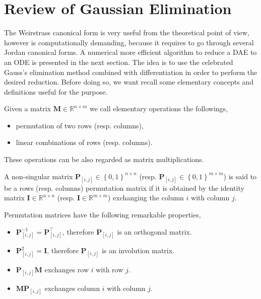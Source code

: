 	\section{Review of Gaussian Elimination}
		The Weirstrass canonical form is very useful from the theoretical point of view,
		however is computationally demanding, because it requires to go through several
		Jordan canonical forms. A numerical more efficient algorithm to reduce a DAE to
		an ODE is presented in the next section. The idea is to use the celebrated
		Gauss's elimination method combined with differentiation in order to perform
		the desired reduction. Before doing so, we want recall some elementary concepts
		and definitions useful for the purpose.
		\begin{definition}
			Given a matrix $\bm{M}\in\mathbb{R}^{n\times m}$ we call elementary operations the followings,
			\begin{itemize}
				\item permutation of two rows (resp. columns),
				\item linear combinations of rows (resp. columns). 
			\end{itemize} 
		\end{definition}
		These operations can be also regarded as matrix multiplications.
		\begin{definition}
			A non-singular matrix $\bm{P}_{[i,j]}\in\left\lbrace0,1\right\rbrace^{n\times n}$ 
			(resp. $\bm{P}_{[i,j]}\in\left\lbrace0,1\right\rbrace^{m\times m}$) is said to be a
			rows (resp. columns) permutation matrix if it is obtained by the identity matrix
			$\bm{I}\in\mathbb{R}^{n\times n}$ (resp. $\bm{I}\in\mathbb{R}^{m\times m}$)
			exchanging the column $i$ with column $j$.
		\end{definition}
		Permutation matrices have the following remarkable properties,
		\begin{itemize}
			\item $\bm{P}_{[i,j]}^{-1} = \bm{P}_{[i,j]}^{\intercal}$, therefore $\bm{P}_{[i,j]}$ is an orthogonal matrix.
			\item $\bm{P}_{[i,j]}^{2}=\bm{I}$, therefore $\bm{P}_{[i,j]}$ is an involution matrix.
			\item $\bm{P}_{[i,j]}\bm{M}$ exchanges row $i$ with row $j$. 
			\item $\bm{M}\bm{P}_{[i,j]}$ exchanges column $i$ with column $j$.
		\end{itemize}
